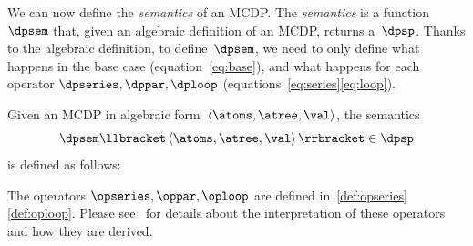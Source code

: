 We can now define the \emph{semantics} of an MCDP. The \emph{semantics}
is a function~$\dpsem$ that, given an algebraic definition of an
MCDP, returns a~$\dpsp$. Thanks to the algebraic definition, to
define~$\dpsem$, we need to only define what happens in the base
case (equation~\ref{eq:base}), and what happens for each operator
$\dpseries,\dppar,\dploop$ (equations~\ref{eq:series}\textendash \ref{eq:loop}).
\begin{definition}
\label{def:dpsem}Given an MCDP in algebraic form~$\left\langle \atoms,\atree,\val\right\rangle $,
the semantics
\[
\dpsem\llbracket\left\langle \atoms,\atree,\val\right\rangle \rrbracket\in\dpsp
\]
is defined as follows:

\vspace{-5mm}
\end{definition}
The operators $\opseries,\oppar,\oploop$ are defined in~\cref{def:opseries}\textendash \cref{def:oploop}.
Please see~\cite[Section VI]{censi16codesign_sep16} for details
about the interpretation of these operators and how they are derived.

